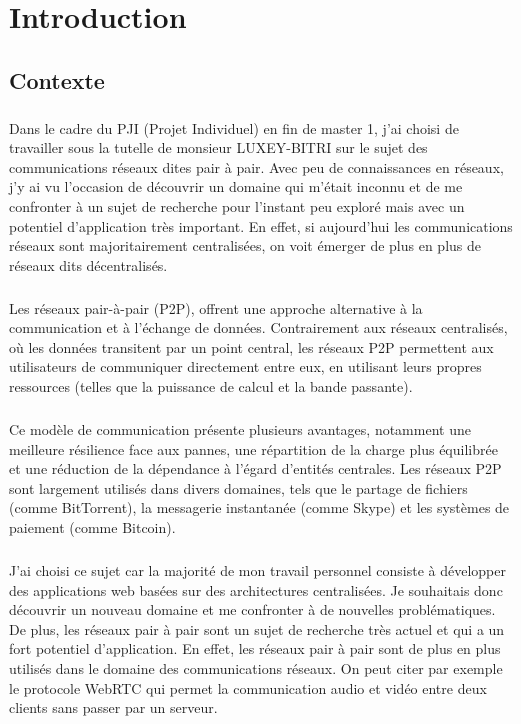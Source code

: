 \chapter{Introduction}

\section{Contexte}

\paragraph{}
Dans le cadre du PJI (Projet Individuel) en fin de master 1, j'ai choisi de travailler sous la tutelle de monsieur LUXEY-BITRI sur le sujet des communications réseaux dites pair à pair.
Avec peu de connaissances en réseaux, j'y ai vu l'occasion de découvrir un domaine qui m'était inconnu et de me confronter à un sujet de recherche pour l'instant peu exploré mais 
avec un potentiel d'application très important. En effet, si aujourd'hui les communications réseaux sont majoritairement centralisées, on voit émerger de plus en plus de réseaux
dits décentralisés. 

\paragraph{}
Les réseaux pair-à-pair (P2P), offrent une approche alternative à la communication et à l'échange de données. Contrairement aux réseaux centralisés, 
où les données transitent par un point central, les réseaux P2P permettent aux utilisateurs de communiquer directement entre eux, en utilisant leurs propres ressources 
(telles que la puissance de calcul et la bande passante).

\paragraph{}
Ce modèle de communication présente plusieurs avantages, notamment une meilleure résilience face aux pannes, une répartition de la charge plus équilibrée et une réduction de la dépendance 
à l'égard d'entités centrales. Les réseaux P2P sont largement utilisés dans divers domaines, tels que le partage de fichiers (comme BitTorrent), la messagerie instantanée (comme Skype) 
et les systèmes de paiement (comme Bitcoin).

\newpage

\paragraph{}
J'ai choisi ce sujet car la majorité de mon travail personnel consiste à développer des applications web basées sur des architectures centralisées. Je souhaitais donc découvrir un nouveau
domaine et me confronter à de nouvelles problématiques. De plus, les réseaux pair à pair sont un sujet de recherche très actuel et qui a un fort potentiel d'application. En effet,
les réseaux pair à pair sont de plus en plus utilisés dans le domaine des communications réseaux. On peut citer par exemple le protocole WebRTC qui permet la communication audio et vidéo
entre deux clients sans passer par un serveur.


